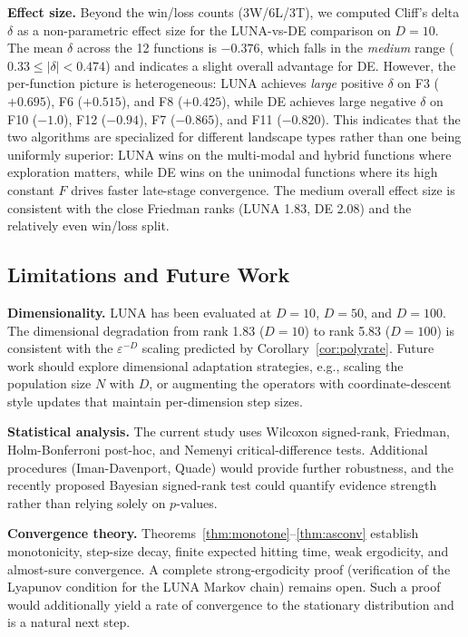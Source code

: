 \documentclass[review]{elsarticle}
\theoremstyle{definition}
\begin{document}
\textbf{Effect size.} Beyond the win/loss counts (3W/6L/3T), we computed Cliff's delta $\delta$ as a non-parametric effect size for the LUNA-vs-DE comparison on $D=10$. The mean $\delta$ across the 12 functions is $-0.376$, which falls in the \emph{medium} range ($0.33 \le |\delta| < 0.474$) and indicates a slight overall advantage for DE. However, the per-function picture is heterogeneous: LUNA achieves \emph{large} positive $\delta$ on F3 ($+0.695$), F6 ($+0.515$), and F8 ($+0.425$), while DE achieves large negative $\delta$ on F10 ($-1.0$), F12 ($-0.94$), F7 ($-0.865$), and F11 ($-0.820$). This indicates that the two algorithms are specialized for different landscape types rather than one being uniformly superior: LUNA wins on the multi-modal and hybrid functions where exploration matters, while DE wins on the unimodal functions where its high constant $F$ drives faster late-stage convergence. The medium overall effect size is consistent with the close Friedman ranks (LUNA 1.83, DE 2.08) and the relatively even win/loss split.

\subsection{Limitations and Future Work}

\textbf{Dimensionality.} LUNA has been evaluated at $D=10$, $D=50$, and $D=100$. The dimensional degradation from rank 1.83 ($D=10$) to rank 5.83 ($D=100$) is consistent with the $\varepsilon^{-D}$ scaling predicted by Corollary~\ref{cor:polyrate}. Future work should explore dimensional adaptation strategies, e.g., scaling the population size $N$ with $D$, or augmenting the operators with coordinate-descent style updates that maintain per-dimension step sizes.

\textbf{Statistical analysis.} The current study uses Wilcoxon signed-rank, Friedman, Holm-Bonferroni post-hoc, and Nemenyi critical-difference tests. Additional procedures (Iman-Davenport, Quade) would provide further robustness, and the recently proposed Bayesian signed-rank test could quantify evidence strength rather than relying solely on $p$-values.

\textbf{Convergence theory.} Theorems~\ref{thm:monotone}--\ref{thm:asconv} establish monotonicity, step-size decay, finite expected hitting time, weak ergodicity, and almost-sure convergence. A complete strong-ergodicity proof (verification of the Lyapunov condition for the LUNA Markov chain) remains open. Such a proof would additionally yield a rate of convergence to the stationary distribution and is a natural next step.
\end{document}
